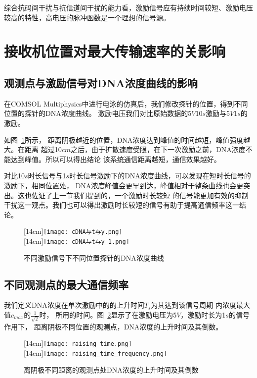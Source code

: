 综合抗码间干扰与抗信道间干扰的能力看，激励信号应有持续时间较短、激励电压较高的特性，高电压的脉冲函数是一个理想的信号源。

\section{接收机位置对最大传输速率的关影响}
\subsection{观测点与激励信号对DNA浓度曲线的影响}

在COMSOL Multiphysics中进行电泳的仿真后，我们修改探针的位置，得到不同位置的探针的DNA浓度曲线。
激励电压我们对比原始数据的5$V$10$s$激励与5$V$1$s$的激励。

如图~\ref{不同激励探针DNA曲线}所示，
距离阴极越近的位置，DNA浓度达到峰值的时间越短，峰值强度越大。在距离
超过10$cm$之后，由于扩散速度受限，在下一次激励之前，DNA浓度不能达到峰值。所以可以得出结论
该系统通信距离越短，通信效果越好。


对比10$s$时长信号与1$s$时长信号激励下的DNA浓度曲线，可以发现在短时长信号的激励下，相同位置处，
DNA浓度峰值会更早到达，峰值相对于整条曲线也会更突出。这也佐证了上一节我们提到的，一个激励时长较短
的信号能更加有效的抑制干扰这一观点。我们也可以得出激励时长较短的信号有助于提高通信频率这一结论。
\begin{figure}[H]
    \centering
                    [14cm]{\texttt{[image: cDNA与t与y.png]}}\\
                    [14cm]{\texttt{[image: cDNA与t与y\_1.png]}}\\
    \caption{不同激励信号下不同位置探针的DNA浓度曲线}
    \label{不同激励探针DNA曲线}
\end{figure}

\subsection{不同观测点的最大通信频率}

我们定义DNA浓度在单次激励中的的上升时间$T_s$为其达到该信号周期
内浓度最大值$c_{max}$的$\frac{1}{\sqrt{2}}$时，
所用的时间。图~\ref{rising time}显示了在激励电压为5$V$，激励时长为1$s$的信号作用下，
距离阴极不同位置的观测点，DNA浓度的上升时间及其倒数。

\begin{figure}[H]
    \centering
                    [14cm]{\texttt{[image: raising time.png]}}\\
                    [14cm]{\texttt{[image: raising\_time\_frequency.png]}}\\
    \caption{离阴极不同距离的观测点处DNA浓度的上升时间及其倒数}
    \label{rising time}
\end{figure}

